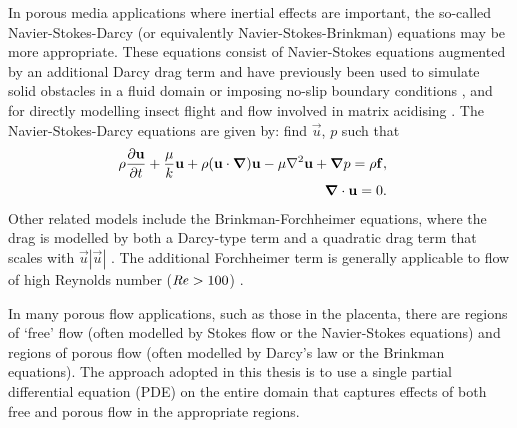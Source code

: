         In porous media applications where inertial effects are important, the so-called Navier-Stokes-Darcy (or equivalently Navier-Stokes-Brinkman) equations may be more appropriate. These equations consist of Navier-Stokes equations augmented by an additional Darcy drag term and have previously been used to simulate solid obstacles in a fluid domain or imposing no-slip boundary conditions \cite{angotPenalizationMethodTake1999,fuchsbergerIncorporationObstaclesFluid2022}, and for directly modelling insect flight \cite{engelsFluSINovelParallel2016} and flow involved in matrix acidising \cite{jiaModelingAnalysisCarbonate2021}. The Navier-Stokes-Darcy equations are given by: find $\vec{u}$, $p$ such that
        \begin{subequations}
            \begin{align}
                \begin{split}
                    \rho \pdv{\vec{u}}{t} + \frac{\mu}{k}\vec{u} + \rho (\vec{u} \cdot \vec{\nabla}) \vec{u} - \mu \nabla^2 \vec{u} + \vec{\nabla} p & = \rho \vec{f},
                \end{split}\\
                \begin{split}
                    \vec{\nabla} \cdot \vec{u} & = 0.
                \end{split}%
            \end{align}%
            \label{eq:navier-stokes-darcy}%
        \end{subequations}%
        Other related models include the Brinkman-Forchheimer equations, where the drag is modelled by both a Darcy-type term and a quadratic drag term that scales with $\vec{u}|\vec{u}|$ \cite{hsuThermalDispersionPorous1990,nieldLimitationsBrinkmanForchheimerEquation1991}. The additional Forchheimer term is generally applicable to flow of high Reynolds number ($\operatorname{\mbox{\textit{Re}}} > 100$) \cite{nieldConvectionPorousMedia2017}.

        In many porous flow applications, such as those in the placenta, there are regions of `free' flow (often modelled by Stokes flow or the Navier-Stokes equations) and regions of porous flow (often modelled by Darcy's law or the Brinkman equations). The approach adopted in this thesis is to use a single partial differential equation (PDE) on the entire domain that captures effects of both free and porous flow in the appropriate regions.
            
